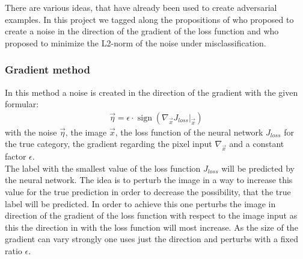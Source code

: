 \documentclass[%
 reprint,
 amsmath,amssymb,
 aps,
]{revtex4-1}
\begin{document}
There are various ideas, that have already been used to create adversarial examples. In this project we tagged along the propositions of \citeauthor{paperGrad} who proposed to create a noise in the direction of the gradient of the loss function and \citeauthor{paperMinimize} who proposed to minimize the L2-norm of the noise under misclassification.
\subsubsection*{Gradient method}
In this method a noise is created in the direction of the gradient with the given formular:
\begin{align*}
\vec{\eta} = \epsilon \cdot \operatorname{sign} \left( \nabla_{\vec{x}} J_{loss} \big \vert_{\vec{x}} \right)
\end{align*}
with the noise $\vec{\eta}$, the image $\vec{x}$, the loss function of the neural network $J_{loss}$ for the true category, the gradient regarding the pixel input $\nabla_{\vec{x}}$ and a constant factor $\epsilon$.\\
The label with the smallest value of the loss function $J_{loss}$ will be predicted by the neural network. The idea is to perturb the image in a way to increase this value for the true prediction in order to decrease the possibility, that the true label will be predicted. In order to achieve this one perturbs the image in direction of the gradient of the loss function with respect to the image input as this the direction in with the loss function will most increase. As the size of the gradient can vary strongly one uses just the direction and perturbs with a fixed ratio $\epsilon$. \cite{paperGrad}
\end{document}
